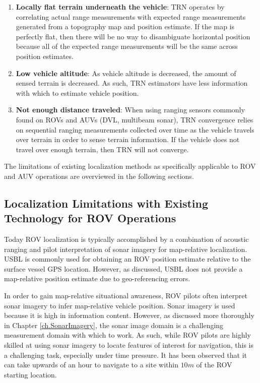 \begin{itemize}
\begin{enumerate}
\item \textbf{Locally flat terrain underneath the vehicle}: TRN operates by correlating actual range measurements with expected range measurements generated from a topography map and position estimate.  If the map is perfectly flat, then there will be no way to disambiguate horizontal position because all of the expected range measurements will be the same across position estimates.
\item \textbf{Low vehicle altitude}: As vehicle altitude is decreased, the amount of sensed terrain is decreased.  As such, TRN estimators have less information with which to estimate vehicle position.
\item \textbf{Not enough distance traveled}: When using ranging sensors commonly found on ROVs and AUVs (DVL, multibeam sonar), TRN convergence relies on sequential ranging measurements collected over time as the vehicle travels over terrain in order to sense terrain information.  If the vehicle does not travel over enough terrain, then TRN will not converge.
\end{enumerate}

\end{itemize}

The limitations of existing localization methods as specifically applicable to ROV and AUV operations are overviewed in the following sections.

\subsection{Localization Limitations with Existing Technology for ROV Operations}
\label{intro.Remotely.Limitations}

Today ROV localization is typically accomplished by a combination of acoustic ranging and pilot interpretation of sonar imagery for map-relative localization.  
USBL is commonly used for obtaining an ROV position estimate relative to the surface vessel GPS location.
However, as discussed, USBL does not provide a map-relative position estimate due to geo-referencing errors.

In order to gain map-relative situational awareness, ROV pilots often interpret sonar imagery to infer map-relative vehicle position.  
Sonar imagery is used because it is high in information content.
However, as discussed more thoroughly in Chapter \ref{ch.SonarImagery}, the sonar image domain is a challenging measurement domain with which to work.
As such, while ROV pilots are highly skilled at using sonar imagery to locate features of interest for navigation, this is a challenging task, especially under time pressure. 
It has been observed that it can take upwards of an hour to navigate to a site within $10m$ of the ROV starting location. 

